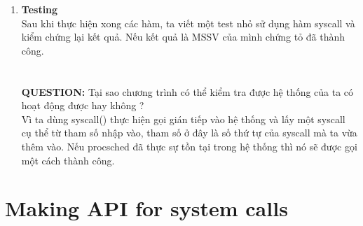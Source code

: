 \documentclass[a4paper]{article}
\begin{document}
\begin{enumerate}
\item \textbf{Testing} \\
Sau khi thực hiện xong các hàm, ta viết một test nhỏ sử dụng hàm syscall và kiểm
chứng lại kết quả. Nếu kết quả là MSSV của mình chứng tỏ đã thành công.
\\
     \\
\\
\textbf{QUESTION:} Tại sao chương trình có thể kiểm tra được hệ thống của ta có hoạt động được hay không ?\\
Vì ta dùng syscall() thực hiện gọi gián tiếp vào hệ
thống và lấy một syscall cụ thể từ tham số nhập vào, tham số ở đây là số thứ tự của syscall mà ta vừa thêm vào. Nếu procsched đã thực sự tồn tại trong hệ thống thì nó sẽ được gọi một cách thành công.
\end{enumerate}

\newpage
\section{Making API for system calls}
  
\end{document}
